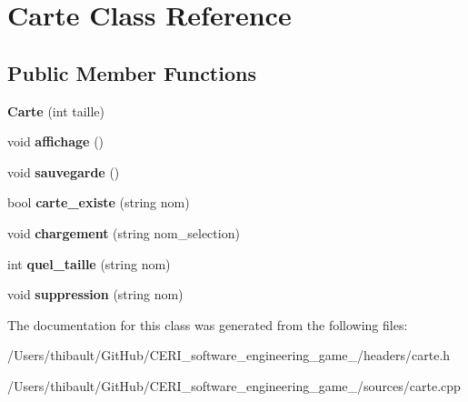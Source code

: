 \hypertarget{class_carte}{}\section{Carte Class Reference}
\label{class_carte}
\subsection*{Public Member Functions}
\begin{DoxyCompactItemize}
\item 
\mbox{\label{class_carte_a4ae030a8222727ee33ee142d53d6ec4d}} 
{\bfseries Carte} (int taille)
\item 
\mbox{\label{class_carte_aed4a23fad7ef43f46f80dbff08468cc9}} 
void {\bfseries affichage} ()
\item 
\mbox{\label{class_carte_aceb1051f87ed3c407bfcf25fe4cc7778}} 
void {\bfseries sauvegarde} ()
\item 
\mbox{\label{class_carte_ac6f52b8e5091958aed3be113c3165fb9}} 
bool {\bfseries carte\+\_\+existe} (string nom)
\item 
\mbox{\label{class_carte_a91460d6675087a93a18374ab02e1a4a4}} 
void {\bfseries chargement} (string nom\+\_\+selection)
\item 
\mbox{\label{class_carte_a4a4e84f2d3d812057c5574a1961584bb}} 
int {\bfseries quel\+\_\+taille} (string nom)
\item 
\mbox{\label{class_carte_a25d96ce76fb05a2ab329ef6791b6a3f2}} 
void {\bfseries suppression} (string nom)
\end{DoxyCompactItemize}


The documentation for this class was generated from the following files\+:\begin{DoxyCompactItemize}
\item 
/\+Users/thibault/\+Git\+Hub/\+C\+E\+R\+I\+\_\+software\+\_\+engineering\+\_\+game\+\_/headers/carte.\+h\item 
/\+Users/thibault/\+Git\+Hub/\+C\+E\+R\+I\+\_\+software\+\_\+engineering\+\_\+game\+\_/sources/carte.\+cpp\end{DoxyCompactItemize}
